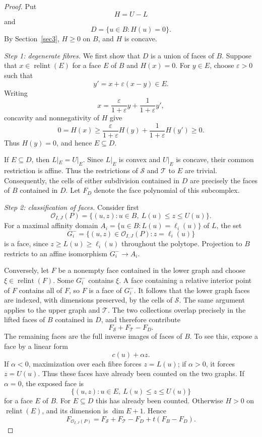 \documentclass[a4paper,12pt]{amsart}
\theoremstyle{definition}
\theoremstyle{remark}
\newcommand{\OO}{\mathcal O}
\newcommand{\relint}{\operatorname{relint}}
\begin{document}
\begin{proof}
Put
\[
 H=U-L
\]
and
\[
 D=\{u\in B:H(u)=0\}.
\]
By Section~\ref{sec3}, $H\geq0$ on $B$, and $H$ is concave.

\smallskip
\noindent\emph{Step 1: degenerate fibres.}
We first show that $D$ is a union of faces of $B$.
Suppose that $x\in\relint(E)$ for a face $E$ of $B$ and $H(x)=0$.
For $y\in E$, choose $\varepsilon>0$ such that
\[
 y'=x+\varepsilon(x-y)\in E.
\]
Writing
\[
 x=\frac{\varepsilon}{1+\varepsilon}y+\frac{1}{1+\varepsilon}y',
\]
concavity and nonnegativity of $H$ give
\[
 0=H(x)\geq \frac{\varepsilon}{1+\varepsilon}H(y)+\frac{1}{1+\varepsilon}H(y')\geq0.
\]
Thus $H(y)=0$, and hence $E\subseteq D$.

If $E\subseteq D$, then $L|_E=U|_E$.
Since $L|_E$ is convex and $U|_E$ is concave, their common restriction is affine.
Thus the restrictions of $\mathcal S$ and $\mathcal T$ to $E$ are trivial.
Consequently, the cells of either subdivision contained in $D$ are precisely the faces of $B$ contained in $D$.
Let $F_D$ denote the face polynomial of this subcomplex.

\smallskip
\noindent\emph{Step 2: classification of faces.}
Consider first
\[
 \OO_{I,J}(P)=\{(u,z):u\in B,\ L(u)\leq z\leq U(u)\}.
\]
For a maximal affinity domain $A_i=\{u\in B:L(u)=\ell_i(u)\}$ of $L$, the set
\[
 G_i^-=\{(u,z)\in\OO_{I,J}(P):z=\ell_i(u)\}
\]
is a face, since $z\geq L(u)\geq\ell_i(u)$ throughout the polytope.
Projection to $B$ restricts to an affine isomorphism $G_i^-\to A_i$.

Conversely, let $F$ be a nonempty face contained in the lower graph and choose $\xi\in\relint(F)$.
Some $G_i^-$ contains $\xi$.
A face containing a relative interior point of $F$ contains all of $F$, so $F$ is a face of $G_i^-$.
It follows that the lower graph faces are indexed, with dimensions preserved, by the cells of $\mathcal S$.
The same argument applies to the upper graph and $\mathcal T$.
The two collections overlap precisely in the lifted faces of $B$ contained in $D$, and therefore contribute
\[
 F_{\mathcal S}+F_{\mathcal T}-F_D.
\]
The remaining faces are the full inverse images of faces of $B$.
To see this, expose a face by a linear form
\[
 c(u)+\alpha z.
\]
If $\alpha<0$, maximization over each fibre forces $z=L(u)$; if $\alpha>0$, it forces $z=U(u)$.
Thus these faces have already been counted on the two graphs.
If $\alpha=0$, the exposed face is
\[
 \{(u,z):u\in E,\ L(u)\leq z\leq U(u)\}
\]
for a face $E$ of $B$.
For $E\subseteq D$ this has already been counted.
Otherwise $H>0$ on $\relint(E)$, and its dimension is $\dim E+1$.
Hence
\begin{equation}\label{eq:old-face-count}
 F_{\OO_{I,J}(P)}  =F_{\mathcal S}+F_{\mathcal T}-F_D+t(F_B-F_D).
\end{equation}


\end{proof}
\end{document}
